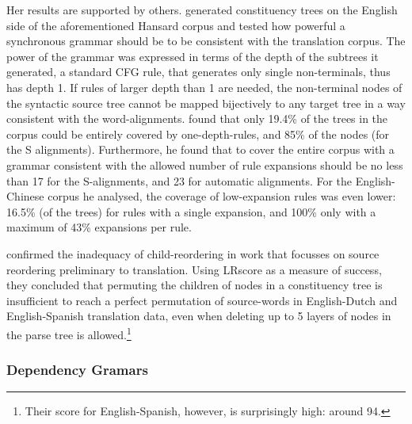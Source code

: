 Her results are supported by others. \cite{galley2004s} generated constituency trees on the English side of the aforementioned Hansard corpus and tested how powerful a synchronous grammar should be to be consistent with the translation corpus. The power of the grammar was expressed in terms of the depth of the subtrees it generated, a standard CFG rule, that generates only single non-terminals, thus has depth 1. If rules of larger depth than 1 are needed, the non-terminal nodes of the syntactic source tree cannot be mapped bijectively to any target tree in a way consistent with the word-alignments. \citeauthor{galley2004s} found that only 19.4\% of the trees in the corpus could be entirely covered by one-depth-rules, and 85\% of the nodes (for the S alignments). Furthermore, he found that to cover the entire corpus with a grammar consistent with the allowed number of rule expansions should be no less than 17 for the S-alignments, and 23 for automatic alignments. For the English-Chinese corpus he analysed, the coverage of low-expansion rules was even lower: 16.5\% (of the trees) for rules with a single expansion, and 100\% only with a maximum of 43\% expansions per rule.

\cite{khalilov2012statistical} confirmed the inadequacy of child-reordering in work that focusses on source reordering preliminary to translation. Using LRscore \citep{birch2010lrscore} as a measure of success, they concluded that permuting the children of nodes in a constituency tree is insufficient to reach a perfect permutation of source-words in English-Dutch and English-Spanish translation data, even when deleting up to 5 layers of nodes in the parse tree is allowed.\footnote{Their score for English-Spanish, however, is surprisingly high: around 94.}


\subsubsection{Dependency Gramars}

